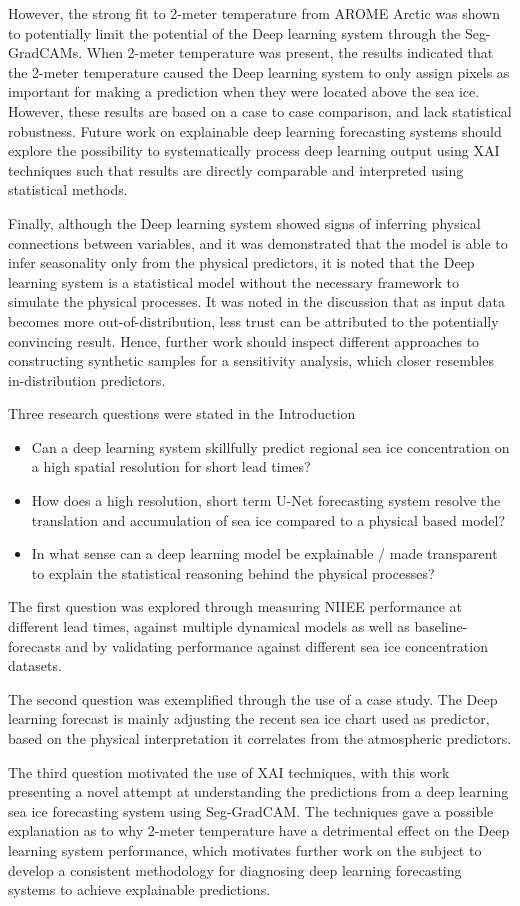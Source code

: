 \documentclass[../main/thesis.tex]{subfiles}
\begin{document}
However, the strong fit to 2-meter temperature from AROME Arctic was shown to potentially limit the potential of the Deep learning system through the Seg-GradCAMs. When 2-meter temperature was present, the results indicated that the 2-meter temperature caused the Deep learning system to only assign pixels as important for making a prediction when they were located above the sea ice. However, these results are based on a case to case comparison, and lack statistical robustness. Future work on explainable deep learning forecasting systems should explore the possibility to systematically process deep learning output using XAI techniques such that results are directly comparable and interpreted using statistical methods.

Finally, although the Deep learning system showed signs of inferring physical connections between variables, and it was demonstrated that the model is able to infer seasonality only from the physical predictors, it is noted that the Deep learning system is a statistical model without the necessary framework to simulate the physical processes. It was noted in the discussion that as input data becomes more out-of-distribution, less trust can be attributed to the potentially convincing result. Hence, further work should inspect different approaches to constructing synthetic samples for a sensitivity analysis, which closer resembles in-distribution predictors.

Three research questions were stated in the Introduction
\begin{itemize}
    \item Can a deep learning system skillfully predict regional sea ice concentration on a high spatial resolution for short lead times?
    \item How does a high resolution, short term U-Net forecasting system resolve the translation and accumulation of sea ice compared to a physical based model?
    \item In what sense can a deep learning model be explainable / made transparent to explain the statistical reasoning behind the physical processes?
\end{itemize}

The first question was explored through measuring NIIEE performance at different lead times, against multiple dynamical models as well as baseline-forecasts and by validating performance against different sea ice concentration datasets. 

The second question was exemplified through the use of a case study. The Deep learning forecast is mainly adjusting the recent sea ice chart used as predictor, based on the physical interpretation it correlates from the atmospheric predictors.

The third question motivated the use of XAI techniques, with this work presenting a novel attempt at understanding the predictions from a deep learning sea ice forecasting system using Seg-GradCAM. The techniques gave a possible explanation as to why 2-meter temperature have a detrimental effect on the Deep learning system performance, which motivates further work on the subject to develop a consistent methodology for diagnosing deep learning forecasting systems to achieve explainable predictions.

\biblio
\end{document}
